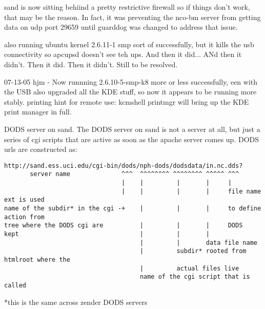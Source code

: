 \documentclass[12pt,twoside]{article}
\begin{document}
sand is now sitting behiind a pretty restrictive firewall so if things don't work, 
that may be the reason.  In fact, it was preventing the nco-bm server from getting 
data on udp port 29659 until guarddog was changed to address that issue.

also running ubuntu kernel 2.6.11-1 smp sort of successfully, but it kills the usb 
connectivity so apcupsd doesn't see teh ups.  And then it did...  ANd then it didn't.
Then it did.  Then it didn't.  Still to be resolved.

07-13-05 hjm - Now runnning 2.6.10-5-smp-k8 more or less successfully, een with the USB
also upgraded all the KDE stuff, so now it appears to be running more stably.
printing hint for remote use:
kcmshell printmgr  
will bring up the KDE print manager in full.

DODS server on sand.  The DODS server on sand is not a server at all, but 
just a series of cgi scripts that are active as soon as the apache server
comes up. DODS urls are constructed as:
\begin{verbatim}
http://sand.ess.uci.edu/cgi-bin/dods/nph-dods/dodsdata/in.nc.dds? 
       server name              ^^^  ^^^^^^^^ ^^^^^^^^ ^^^^^ ^^^
                                |    |         |       |     |
                                |    |         |       |     file name ext is used
name of the subdir* in the cgi -+    |         |       |     to define action from 
tree where the DODS cgi are          |         |       |     DODS
kept                                 |         |       |
                                     |         |       data file name      
                                     |         subdir* rooted from htmlroot where the 
                                     |         actual files live
                                     name of the cgi script that is called
\end{verbatim}
*this is the same across zender DODS servers
\end{document}
